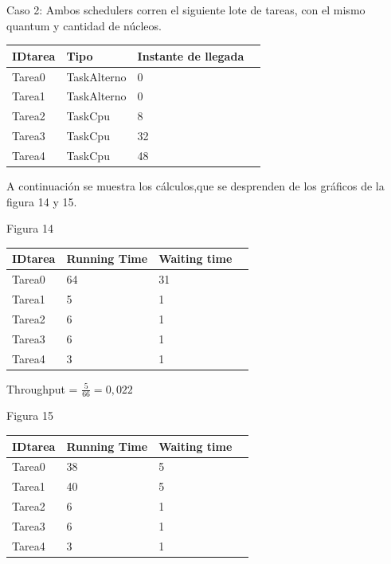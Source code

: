 \documentclass[10pt, a4paper]{article}
\begin{document}
Caso 2: Ambos schedulers corren el siguiente lote de tareas, con el mismo quantum y cantidad de núcleos.

\begin{center}
\begin{tabular}{| l | l | l | l |}
    \hline
    IDtarea &  Tipo & Instante de llegada\\ \hline
    Tarea0 & 	TaskAlterno & 0 \\ \hline
    Tarea1 &	TaskAlterno & 0 \\ \hline
    Tarea2 &	TaskCpu & 8\\ \hline
    Tarea3 &	TaskCpu & 32 \\ \hline
    Tarea4 &	TaskCpu & 48 \\ \hline
   
\end{tabular}
\end{center}

A continuación se muestra los cálculos,que se desprenden de los gráficos de la figura 14 y 15.

\begin{center}
Figura 14
\end{center}

\begin{center}
  
\begin{tabular}{| l | l | l | l |}    
    \hline
    IDtarea &  Running Time & Waiting time\\ \hline
    Tarea0 & 	64 & 31   \\ \hline
    Tarea1 & 	5 & 1 \\ \hline
    Tarea2 &	6 & 1 \\ \hline
    Tarea3 &	6 & 1 \\ \hline
    Tarea4 &	3& 1 \\ \hline
   
\end{tabular}
\end{center}


\begin{center}
Throughput = $\frac{5}{66} = 0,022$
\end{center}



\begin{center}
Figura 15
\end{center}

\begin{center}
\begin{tabular}{| l | l | l | l |}
    \hline
    IDtarea &  Running Time & Waiting time\\ \hline
    Tarea0 & 	38 & 5 \\ \hline
    Tarea1 &	40 & 5 \\ \hline
    Tarea2 &	6 & 1 \\ \hline
    Tarea3 &	6 & 1 \\ \hline
    Tarea4 &	3& 1 \\ \hline
   
   
\end{tabular}
\end{center}
\end{document}
